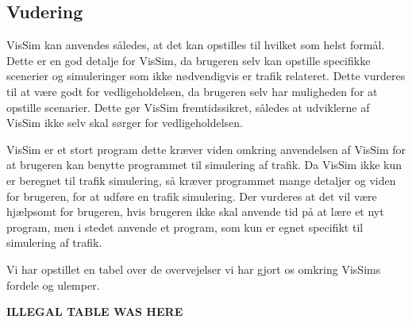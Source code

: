 \begin{figure}[ht]
\caption{}\label{GrafForDecelerationVisSimGPS}
\end{figure}

\subsection{Vudering}
VisSim kan anvendes således, at det kan opstilles til hvilket som helst formål. Dette er en god detalje for VisSim, da brugeren selv kan opstille specifikke scenerier og simuleringer som ikke nødvendigvis er trafik relateret. Dette vurderes til at være godt for vedligeholdelsen, da brugeren selv har muligheden for at opstille scenarier. Dette gør VisSim fremtidssikret, således at udviklerne af VisSim ikke selv skal sørger for vedligeholdelsen.

VisSim er et stort program dette kræver viden omkring anvendelsen af VisSim for at brugeren kan benytte programmet til simulering af trafik. Da VisSim ikke kun er beregnet til trafik simulering, så kræver programmet mange detaljer og viden for brugeren, for at udføre en trafik simulering. Der vurderes at det vil være hjælpsomt for brugeren, hvis brugeren ikke skal anvende tid på at lære et nyt program, men i stedet anvende et program, som kun er egnet specifikt til simulering af trafik. 

Vi har opstillet en tabel over de overvejelser vi har gjort os omkring VisSims fordele og ulemper.

\textbf{ILLEGAL TABLE WAS HERE}



